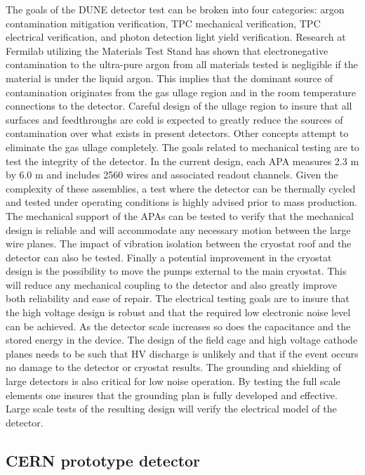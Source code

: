The goals of the DUNE detector test can be broken into four categories: argon contamination mitigation verification, TPC mechanical verification, TPC electrical verification, and photon detection light yield verification. Research at Fermilab utilizing the Materials Test Stand has shown that electronegative contamination to the ultra-pure argon from all materials tested is negligible if the material is under the liquid argon. This implies that the dominant source of contamination originates from the gas ullage region and in the room temperature connections to the detector. Careful design of the ullage region to insure that all surfaces and feedthroughs are cold is expected to greatly reduce the sources of contamination over what exists in present detectors. Other concepts attempt to eliminate the gas ullage completely. The goals related to mechanical testing are to test the integrity of the detector. In the current design, each APA measures 2.3 m by 6.0 m and includes 2560 wires and associated readout channels. Given the complexity of these assemblies, a test where the detector can be thermally cycled and tested under operating conditions is highly advised prior to mass production. The mechanical support of the APAs can be tested to verify that the mechanical design is reliable and will accommodate any necessary motion between the large wire planes. The impact of vibration isolation between the cryostat roof and the detector can also be tested. Finally a potential improvement in the cryostat design is the possibility to move the pumps external to the main cryostat. This will reduce any mechanical coupling to the detector and also greatly improve both reliability and ease of repair. The electrical testing goals are to insure that the high voltage design is robust and that the required low electronic noise level can be achieved. As the detector scale increases so does the capacitance and the stored energy in the device. The design of the field cage and high voltage cathode planes needs to be such that HV discharge is unlikely and that if the event occurs no damage to the detector or cryostat results. The grounding and shielding of large detectors is also critical for low noise operation. By testing the full scale elements one insures that the grounding plan is fully developed and effective. Large scale tests of the resulting design will verify the electrical model of the detector. 


\subsection{CERN prototype detector}

